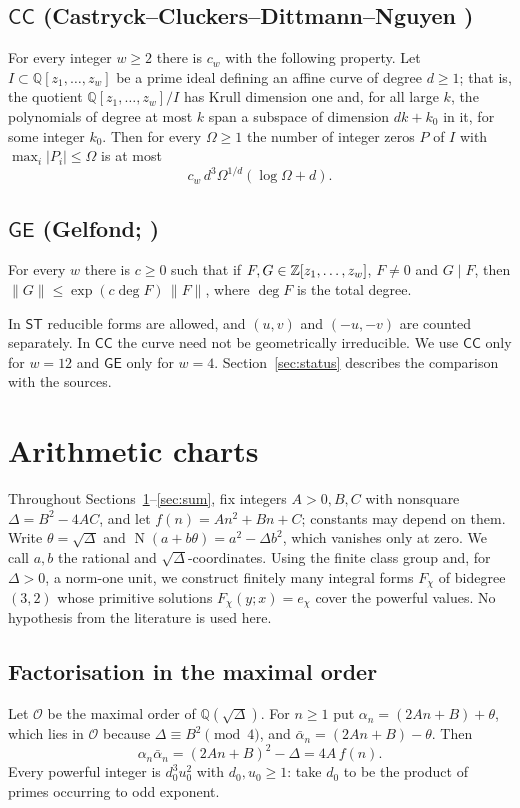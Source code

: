 \documentclass[11pt,reqno]{amsart}
\theoremstyle{definition}
\theoremstyle{remark}
\numberwithin{equation}{section}
\newcommand{\Q}{\mathbb Q}\newcommand{\C}{\mathbb C}
\newcommand{\ST}{\mathsf{ST}}\newcommand{\CC}{\mathsf{CC}}\newcommand{\GE}{\mathsf{GE}}
\newcommand{\OO}{\mathcal O}
\newcommand{\Nm}{\operatorname{N}}
\begin{document}
\subsection*{$\CC$ (Castryck--Cluckers--Dittmann--Nguyen \cite[Theorem~3]{ccdn})}
For every integer $w\ge2$ there is $c_w$ with the following property. Let
$I\subset\Q[z_1,\dots,z_w]$ be a prime ideal defining an affine curve of
degree $d\ge1$; that is, the quotient $\Q[z_1,\dots,z_w]/I$ has Krull
dimension one and, for all large $k$, the polynomials of degree at most $k$
span a subspace of dimension $dk+k_0$ in it, for some integer $k_0$. Then for
every $\Omega\ge1$ the number of integer zeros $P$ of $I$ with
$\max_i|P_i|\le\Omega$ is at most
\[
 c_w\,d^3\Omega^{1/d}(\log\Omega+d).
\]

\subsection*{$\GE$ (Gelfond; \cite[Lemma~1.6.11]{bg})}
For every $w$ there is $c\ge0$ such that if $F,G\in\mathbb Z[z_1,\dots,z_w]$,
$F\ne0$ and $G\mid F$, then $\|G\|\le\exp(c\deg F)\,\|F\|$, where $\deg F$
is the total degree.

\medskip
In $\ST$ reducible forms are allowed, and $(u,v)$ and $(-u,-v)$ are counted
separately. In $\CC$ the curve need not be geometrically irreducible. We
use $\CC$ only for $w=12$ and $\GE$ only for $w=4$.
Section~\ref{sec:status} describes the comparison with the sources.

\section{Arithmetic charts}\label{sec:charts}
Throughout Sections~\ref{sec:charts}--\ref{sec:sum}, fix integers
$A>0,B,C$ with nonsquare $\Delta=B^2-4AC$, and let $f(n)=An^2+Bn+C$;
constants may depend on them. Write $\theta=\sqrt\Delta$ and
$\Nm(a+b\theta)=a^2-\Delta b^2$, which vanishes only at zero.
We call $a,b$ the rational and $\sqrt\Delta$-coordinates.
Using the finite class group and, for $\Delta>0$, a norm-one unit,
we construct finitely many integral forms $F_\chi$ of bidegree $(3,2)$
whose primitive solutions $F_\chi(y;x)=e_\chi$ cover the powerful
values. No hypothesis from the literature is used here.

\subsection{Factorisation in the maximal order}
Let $\OO$ be the maximal order of $\Q(\sqrt\Delta)$. For $n\ge1$ put
$\alpha_n=(2An+B)+\theta$, which lies in $\OO$ because
$\Delta\equiv B^2\pmod4$, and
$\bar\alpha_n=(2An+B)-\theta$. Then
\begin{equation}\label{eq:alphanorm}
 \alpha_n\bar\alpha_n=(2An+B)^2-\Delta=4A\,f(n).
\end{equation}
Every powerful integer is $d_0^3u_0^2$ with $d_0,u_0\ge1$: take
$d_0$ to be the product of primes occurring to odd exponent.
\end{document}
